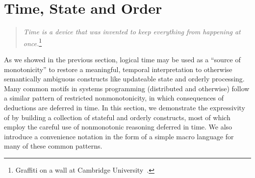 \section{Time, State and Order}
\label{sec:stateupdate}

\begin{quote}
%
\emph{Time is a device that was invented to keep everything from
happening at once.}\footnote{Graffiti on a wall at Cambridge
University~\cite{scheme}.}
%
\end{quote} 


As we showed in the previous section, logical time may be used as a 
``source of monotonicity'' to restore a meaningful, temporal interpretation to otherwise
semantically ambiguous constructs like updateable state and orderly processing.  
Many common motifs in systems programming
(distributed and otherwise) follow a similar pattern of restricted nonmonotonicity, in 
which consequences of deductions are deferred in time.  In this section, we demonstrate
the expressivity of \lang by building a collection of stateful and orderly constructs,
most of which employ the careful use of nonmonotonic reasoning deferred in time.
We also introduce a convenience notation in the form of a simple macro language
for many of these common patterns.




